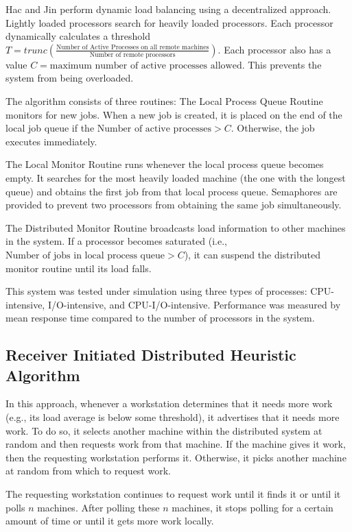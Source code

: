 \documentclass{report}
\newcommand{\ds}{distributed system\xspace}
\begin{document}
Hac and Jin perform dynamic load balancing using a decentralized approach.
Lightly loaded processors search for heavily loaded processors.  Each
processor dynamically calculates a threshold $T = trunc ( \frac{\mbox{Number
of Active Processes on all remote machines}}{\mbox{Number of remote
processors}} )$.  Each processor also has a value $C = \mbox{maximum number
of active processes allowed}$.  This prevents the system from being
overloaded.

The algorithm consists of three routines: The Local Process Queue Routine
monitors for new jobs.  When a new job is created, it is placed on the end
of the local job queue if the $\mbox{Number of active processes} > C$.
Otherwise, the job executes immediately.

The Local Monitor Routine runs whenever the local process queue becomes
empty.  It searches for the most heavily loaded machine (the one with the
longest queue) and obtains the first job from that local process queue.
Semaphores are provided to prevent two processors from obtaining the same
job simultaneously.

The Distributed Monitor Routine broadcasts load information to other
machines in the system.  If a processor becomes saturated (i.e.,
$\mbox{Number of jobs in local process queue} > C$), it can suspend the
distributed monitor routine until its load falls.

This system was tested under simulation using three types of processes:
CPU-intensive, I/O-intensive, and CPU-I/O-intensive.  Performance was
measured by mean response time compared to the number of processors in the
system.

\subsection{Receiver Initiated Distributed Heuristic Algorithm \cite{Tanenbaum}}

In this approach, whenever a workstation determines that it needs more work
(e.g., its load average is below some threshold), it advertises that it
needs more work.  To do so, it selects another machine within the \ds at
random and then requests work from that machine.  If the machine gives it
work, then the requesting workstation performs it.  Otherwise, it picks
another machine at random from which to request work.

The requesting workstation continues to request work until it finds it or
until it polls $n$ machines.  After polling these $n$ machines, it stops
polling for a certain amount of time or until it gets more work locally.
\end{document}
